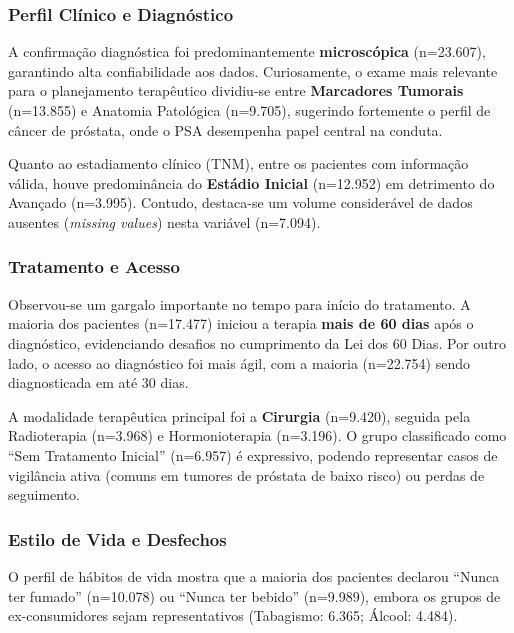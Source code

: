\documentclass[
]{article}
\begin{document}
\subsubsection{Perfil Clínico e
Diagnóstico}\label{perfil-cluxednico-e-diagnuxf3stico}

A confirmação diagnóstica foi predominantemente \textbf{microscópica}
(n=23.607), garantindo alta confiabilidade aos dados. Curiosamente, o
exame mais relevante para o planejamento terapêutico dividiu-se entre
\textbf{Marcadores Tumorais} (n=13.855) e Anatomia Patológica (n=9.705),
sugerindo fortemente o perfil de câncer de próstata, onde o PSA
desempenha papel central na conduta.

Quanto ao estadiamento clínico (TNM), entre os pacientes com informação
válida, houve predominância do \textbf{Estádio Inicial} (n=12.952) em
detrimento do Avançado (n=3.995). Contudo, destaca-se um volume
considerável de dados ausentes (\emph{missing values}) nesta variável
(n=7.094).

\subsubsection{Tratamento e Acesso}\label{tratamento-e-acesso}

Observou-se um gargalo importante no tempo para início do tratamento. A
maioria dos pacientes (n=17.477) iniciou a terapia \textbf{mais de 60
dias} após o diagnóstico, evidenciando desafios no cumprimento da Lei
dos 60 Dias. Por outro lado, o acesso ao diagnóstico foi mais ágil, com
a maioria (n=22.754) sendo diagnosticada em até 30 dias.

A modalidade terapêutica principal foi a \textbf{Cirurgia} (n=9.420),
seguida pela Radioterapia (n=3.968) e Hormonioterapia (n=3.196). O grupo
classificado como ``Sem Tratamento Inicial'' (n=6.957) é expressivo,
podendo representar casos de vigilância ativa (comuns em tumores de
próstata de baixo risco) ou perdas de seguimento.

\subsubsection{Estilo de Vida e
Desfechos}\label{estilo-de-vida-e-desfechos}

O perfil de hábitos de vida mostra que a maioria dos pacientes declarou
``Nunca ter fumado'' (n=10.078) ou ``Nunca ter bebido'' (n=9.989),
embora os grupos de ex-consumidores sejam representativos (Tabagismo:
6.365; Álcool: 4.484).
\end{document}
